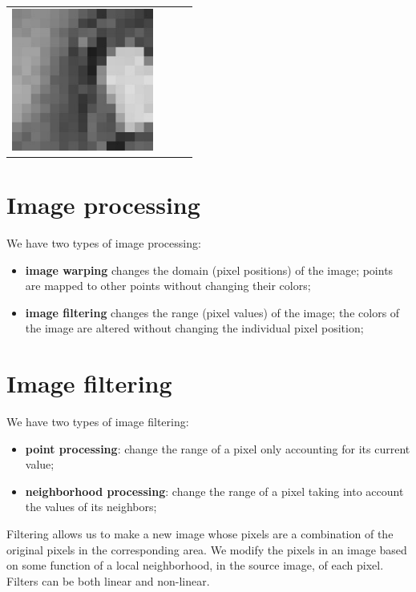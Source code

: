 \documentclass{article}
\begin{document}
\begin{center}
\begin{tabular}{llll}
        \includegraphics[width=.2\linewidth]{images/b_.png} \\
    \end{tabular}
\end{center}

\newpage

\section*{Image processing}

We have two types of image processing:

\begin{itemize}
    \item \textbf{image warping} changes the domain (pixel positions) of the image; points
are mapped to other points without changing their colors;
    \item \textbf{image filtering} changes the range (pixel values) of the image; the colors of the image are altered without changing the individual pixel position; 
\end{itemize}

\section*{Image filtering}

We have two types of image filtering:

\begin{itemize}
    \item \textbf{point processing}: change the range of a pixel only accounting for its current value;
    \item \textbf{neighborhood processing}: change the range of a pixel taking into account the values of its neighbors;
\end{itemize}

Filtering allows us to make a new image whose pixels are a combination of the original pixels in the corresponding area. We modify the pixels in an image based on some function of a local neighborhood, in the source image, of each pixel. Filters can be both linear and non-linear.
\end{document}
